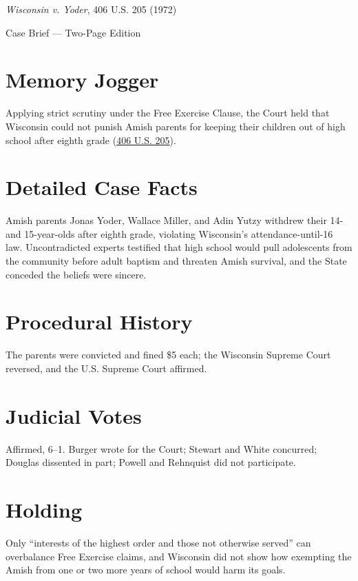 \documentclass[12pt]{article}
\begin{document}
\begin{center}
{\LARGE \textit{Wisconsin v. Yoder}, 406 U.S. 205 (1972)\par}
\vspace{0.5em}
{\large Case Brief --- Two-Page Edition\par}
\end{center}

\section{Memory Jogger}
Applying strict scrutiny under the Free Exercise Clause, the Court held that Wisconsin could not punish Amish parents for keeping their children out of high school after eighth grade (\href{https://supreme.justia.com/cases/federal/us/406/205/}{406 U.S. 205}).

\section{Detailed Case Facts}
Amish parents Jonas Yoder, Wallace Miller, and Adin Yutzy withdrew their 14- and 15-year-olds after eighth grade, violating Wisconsin's attendance-until-16 law. Uncontradicted experts testified that high school would pull adolescents from the community before adult baptism and threaten Amish survival, and the State conceded the beliefs were sincere.

\section{Procedural History}
The parents were convicted and fined \$5 each; the Wisconsin Supreme Court reversed, and the U.S. Supreme Court affirmed.

\section{Judicial Votes}
Affirmed, 6--1. Burger wrote for the Court; Stewart and White concurred; Douglas dissented in part; Powell and Rehnquist did not participate.

\section{Holding}
Only ``interests of the highest order and those not otherwise served'' can overbalance Free Exercise claims, and Wisconsin did not show how exempting the Amish from one or two more years of school would harm its goals.
\end{document}

